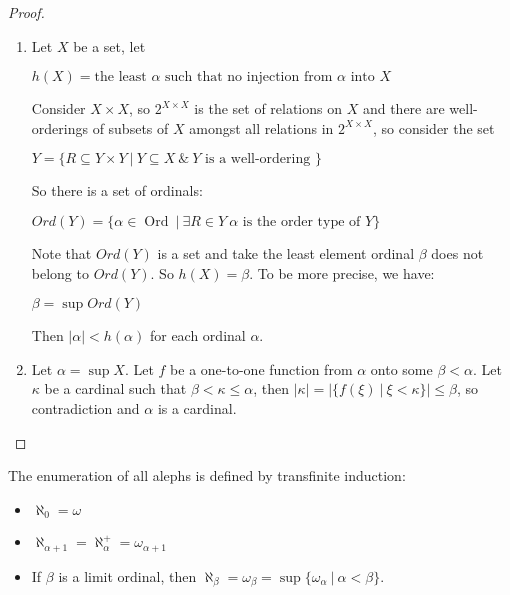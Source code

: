 \documentclass[8pt]{article}
\theoremstyle{definition}
\theoremstyle{definition}
\theoremstyle{definition}
\theoremstyle{definition}
\theoremstyle{definition}
\theoremstyle{definition}
\theoremstyle{definition}
\theoremstyle{definition}
\theoremstyle{definition}
\theoremstyle{definition}
\theoremstyle{definition}
\theoremstyle{definition}
\theoremstyle{col}
\theoremstyle{question}
\begin{document}
\begin{proof}
  $ $

  \begin{enumerate}
    \item Let $X$ be a set, let 
    \begin{center}
      $h(X) = \text{the least $\alpha$ such that no injection from $\alpha$ into $X$}$
    \end{center}

    Consider $X \times X$, so $2^{X \times X}$ is the set of relations on $X$ and there 
    are well-orderings of subsets of $X$ amongst all relations in $2^{X \times X}$, so consider the set
    \begin{center}
      $Y = \{ R \subseteq Y \times Y \: | \: Y \subseteq X \: \& \: \text{$Y$ is a well-ordering }\}$
    \end{center}

    So there is a set of ordinals:
    \begin{center}
      $Ord(Y) = \{ \alpha \in \operatorname{Ord} \: | \: \exists R \in Y \: \text{$\alpha$ is the order type of $Y$}  \}$
    \end{center}
    Note that $Ord(Y)$ is a set and take the least element ordinal $\beta$ does not belong to $Ord(Y)$. So $h(X) = \beta$.
    To be more precise, we have:
    \begin{center}
      $\beta = \sup Ord(Y)$
    \end{center}

    Then $|\alpha| < h(\alpha)$ for each ordinal $\alpha$.

    \item Let $\alpha = \sup X$. Let $f$ be a one-to-one function from $\alpha$ onto some $\beta < \alpha$.
    Let $\kappa$ be a cardinal such that $\beta < \kappa \leq \alpha$, then $|\kappa| = |\{ f(\xi) \: | \: \xi < \kappa \}| \leq \beta$, 
    so contradiction and $\alpha$ is a cardinal.
  \end{enumerate}
\end{proof}

The enumeration of all alephs is defined by transfinite induction:
\begin{itemize}
  \item $\aleph_0 = \omega$
  \item $\aleph_{\alpha + 1} =\aleph_{\alpha}^+ = \omega_{\alpha+1}$
  \item If $\beta$ is a limit ordinal, then $\aleph_{\beta} = \omega_{\beta} = \sup \{ \omega_{\alpha} \: | \: \alpha < \beta \}$.
\end{itemize}
\end{document}
